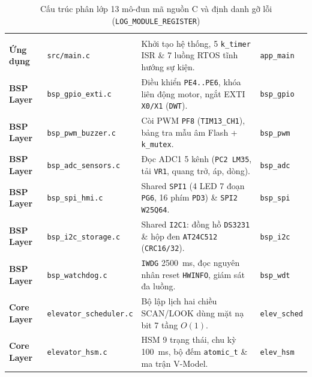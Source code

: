 \begingroup
\renewcommand{\arraystretch}{1.20}%
\setlength{\tabcolsep}{4.5pt}%
\fontsize{8.2}{10.5}\selectfont
{}%
\begin{xltabular}{\textwidth}{|L{2.2cm}|L{3.3cm}|Y|C{1.8cm}|}
\caption{Cấu trúc phân lớp 13 mô-đun mã nguồn C và định danh gỡ lỗi (\texttt{LOG\_MODULE\_\allowbreak REGISTER})}\label{tab:modules}\\
\hline
{}
 &  &  &  \\
\hline
\endfirsthead
\hline
{}
 &  &  &  \\
\hline
\endhead
\hline
\endfoot
\hline
\endlastfoot
\textbf{Ứng dụng} & \texttt{src/main.c} & Khởi tạo hệ thống, 5 \texttt{k\_timer} ISR \& 7 luồng RTOS tĩnh hướng sự kiện. & \texttt{app\_main} \\
\hline
{}
\textbf{BSP Layer} & \texttt{bsp\_gpio\_exti.c} & Điều khiển \texttt{PE4..PE6}, khóa liên động motor, ngắt EXTI \texttt{X0/X1} (\texttt{DWT}). & \texttt{bsp\_gpio} \\
\hline
\textbf{BSP Layer} & \texttt{bsp\_pwm\_buzzer.c} & Còi PWM \texttt{PF8} (\texttt{TIM13\_CH1}), bảng tra mẫu âm Flash + \texttt{k\_mutex}. & \texttt{bsp\_pwm} \\
\hline
{}
\textbf{BSP Layer} & \texttt{bsp\_adc\_sensors.c} & Đọc ADC1 5 kênh (\texttt{PC2 LM35}, tải \texttt{VR1}, quang trở, áp, dòng). & \texttt{bsp\_adc} \\
\hline
\textbf{BSP Layer} & \texttt{bsp\_spi\_hmi.c} & Shared \texttt{SPI1} (4 LED 7 đoạn \texttt{PG6}, 16 phím \texttt{PD3}) \& \texttt{SPI2 W25Q64}. & \texttt{bsp\_spi} \\
\hline
{}
\textbf{BSP Layer} & \texttt{bsp\_i2c\_storage.c} & Shared \texttt{I2C1}: đồng hồ \texttt{DS3231} \& hộp đen \texttt{AT24C512} (\texttt{CRC16/32}). & \texttt{bsp\_i2c} \\
\hline
\textbf{BSP Layer} & \texttt{bsp\_watchdog.c} & \texttt{IWDG} 2500~ms, đọc nguyên nhân reset \texttt{HWINFO}, giám sát đa luồng. & \texttt{bsp\_wdt} \\
\hline
{}
\textbf{Core Layer} & \texttt{elevator\_scheduler.c} & Bộ lập lịch hai chiều SCAN/LOOK dùng mặt nạ bit 7 tầng $O(1)$. & \texttt{elev\_sched} \\
\hline
\textbf{Core Layer} & \texttt{elevator\_hsm.c} & HSM 9 trạng thái, chu kỳ 100~ms, bộ đếm \texttt{atomic\_t} \& ma trận V-Model. & \texttt{elev\_hsm} \\

\end{xltabular}
